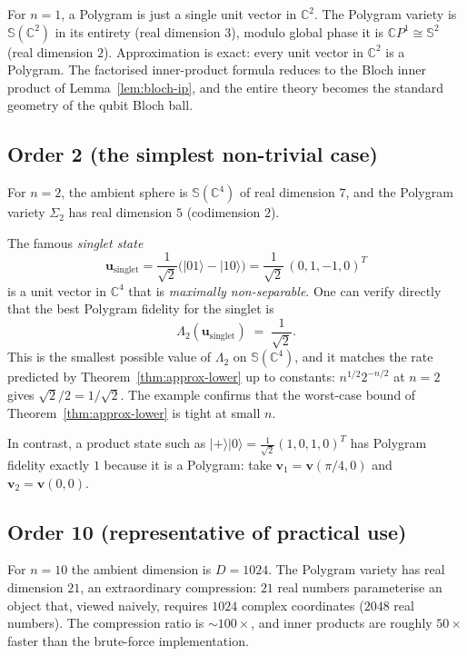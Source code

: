 \documentclass[11pt,letterpaper]{article}
\theoremstyle{definition}
\newcommand{\C}{\mathbb{C}}
\newcommand{\Sphere}{\mathbb{S}}
\newcommand{\ket}[1]{\lvert #1 \rangle}
\begin{document}
For $n = 1$, a Polygram is just a single unit vector in $\C^{2}$. The Polygram
variety is $\Sphere(\C^{2})$ in its entirety (real dimension $3$), modulo
global phase it is $\C P^{1} \cong \Sphere^{2}$ (real dimension $2$).
Approximation is exact: every unit vector in $\C^{2}$ is a Polygram. The
factorised inner-product formula reduces to the Bloch inner product of
Lemma~\ref{lem:bloch-ip}, and the entire theory becomes the standard
geometry of the qubit Bloch ball.

\subsection{Order 2 (the simplest non-trivial case)}

For $n = 2$, the ambient sphere is $\Sphere(\C^{4})$ of real dimension $7$,
and the Polygram variety $\Sigma_{2}$ has real dimension $5$ (codimension
$2$).

The famous \emph{singlet state}
\[
\bm{u}_{\text{singlet}}
   = \frac{1}{\sqrt{2}}\big(\ket{01} - \ket{10}\big)
   = \frac{1}{\sqrt{2}}\,(0, 1, -1, 0)^{T}
\]
is a unit vector in $\C^{4}$ that is \emph{maximally non-separable}. One can
verify directly that the best Polygram fidelity for the singlet is
\[
\Lambda_{2}(\bm{u}_{\text{singlet}}) \;=\; \frac{1}{\sqrt{2}}.
\]
This is the smallest possible value of $\Lambda_{2}$ on $\Sphere(\C^{4})$,
and it matches the rate predicted by Theorem~\ref{thm:approx-lower} up to
constants: $n^{1/2} 2^{-n/2}$ at $n = 2$ gives $\sqrt{2}/2 = 1/\sqrt{2}$.
The example confirms that the worst-case bound of
Theorem~\ref{thm:approx-lower} is tight at small $n$.

In contrast, a product state such as $\ket{+}\ket{0} = \tfrac{1}{\sqrt 2}
(1, 0, 1, 0)^{T}$ has Polygram fidelity exactly $1$ because it is a Polygram:
take $\bm{v}_{1} = \bm{v}(\pi/4, 0)$ and $\bm{v}_{2} = \bm{v}(0, 0)$.

\subsection{Order 10 (representative of practical use)}

For $n = 10$ the ambient dimension is $D = 1024$. The Polygram variety has
real dimension $21$, an extraordinary compression: $21$ real numbers
parameterise an object that, viewed naively, requires $1024$ complex
coordinates ($2048$ real numbers). The compression ratio is $\sim 100\times$,
and inner products are roughly $50\times$ faster than the brute-force
implementation.
\end{document}
